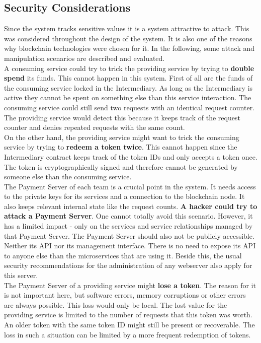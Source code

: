 \documentclass[a4paper,12pt]{scrartcl}
\begin{document}
\subsection{Security Considerations}

Since the system tracks sensitive values it is a system attractive to attack. This was considered throughout the design of the system. It is also one of the reasons why blockchain technologies were chosen for it. In the following, some attack and manipulation scenarios are described and evaluated.\\

A consuming service could try to trick the providing service by trying to \textbf{double spend} its funds. This cannot happen in this system. First of all are the funds of the consuming service locked in the Intermediary. As long as the Intermediary is active they cannot be spent on something else than this service interaction. The consuming service could still send two requests with an identical request counter. The providing service would detect this because it keeps track of the request counter and denies repeated requests with the same count.\\

On the other hand, the providing service might want to trick the consuming service by trying to \textbf{redeem a token twice}. This cannot happen since the Intermediary contract keeps track of the token IDs and only accepts a token once. The token is cryptographically signed and therefore cannot be generated by someone else than the consuming service.\\

The Payment Server of each team is a crucial point in the system. It needs access to the private keys for its services and a connection to the blockchain node. It also keeps relevant internal state like the request counts. \textbf{A hacker could try to attack a Payment Server}. One cannot totally avoid this scenario. However, it has a limited impact - only on the services and service relationships managed by that Payment Server. The Payment Server should also not be publicly accessible. Neither its API nor its management interface. There is no need to expose its API to anyone else than the microservices that are using it. Beside this, the usual security recommendations for the administration of any webserver also apply for this server.\\

The Payment Server of a providing service might \textbf{lose a token}. The reason for it is not important here, but software errors, memory corruptions or other errors are always possible. This loss would only be local. The lost value for the providing service is limited to the number of requests that this token was worth. An older token with the same token ID might still be present or recoverable. The loss in such a situation can be limited by a more frequent redemption of tokens.\\
\end{document}
